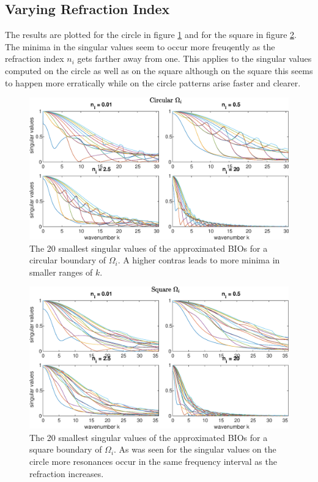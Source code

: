\documentclass[a4paper, oneside]{discothesis}
\begin{document}
\subsection{Varying Refraction Index}
The results are plotted for the circle in figure \ref{fig:SVs_circle_refraction} and for the square in figure \ref{fig:SVs_square_refraction}. 
The minima in the singular values seem to occur more freuqently as the refraction index $n_i$ gets farther away from one.
This applies to the singular values computed on the circle as well as on the square although on the square this seems to happen more erratically while on the circle patterns arise faster and clearer.
\begin{figure} [H]
	\centering
	\includegraphics[width=\columnwidth]{figures/SVs_circle_refraction.eps}
	\caption{
		The 20 smallest singular values of the approximated BIOs for a circular boundary of $\Omega_i$. 
		A higher contras leads to more minima in smaller ranges of $k$.
	}
	\label{fig:SVs_circle_refraction}
\end{figure}
\begin{figure} [H]
	\centering
	\includegraphics[width=\columnwidth]{figures/SVs_square_refraction.eps}
	\caption{ 
		The 20 smallest singular values of the approximated BIOs for a square boundary of $\Omega_i$.
		As was seen for the singular values on the circle more resonances occur in the same frequency interval as the refraction increases.
	}
	\label{fig:SVs_square_refraction}
\end{figure}
\newpage
\end{document}
